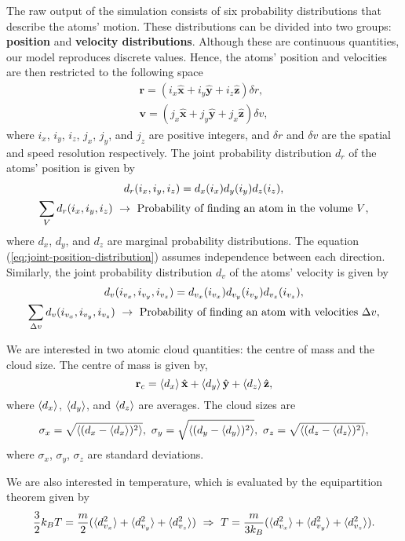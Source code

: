 The raw output of the simulation consists of six probability distributions that describe the atoms' motion. These distributions can be divided into two groups: \textbf{position} and \textbf{velocity distributions}. Although these are continuous quantities, our model reproduces discrete values. Hence, the atoms' position and velocities are then restricted to the following space
\begin{gather}
    \mathbf{r} = (i_x \hat{\mathbf{x}} + i_y \hat{\mathbf{y}} + i_z \hat{\mathbf{z}}) \delta r, \\
    \mathbf{v} = (j_x \hat{\mathbf{x}} + j_y \hat{\mathbf{y}} + j_x \hat{\mathbf{z}}) \delta v,
\end{gather}
where $ i_x $, $ i_y $, $ i_z $, $ j_x $, $ j_y $, and $ j_z $ are positive integers, and $ \delta r $ and $ \delta v $ are the spatial and speed resolution respectively. The joint probability distribution $d_r$ of the atoms' position is given by
\begin{gather}
    d_{r}(i_x, i_y, i_z) = d_x(i_x) d_y(i_y) d_z(i_z),
    \label{eq:joint-position-distribution}
    \\
    \sum_{V} d_r(i_x,i_y,i_z) \ \rightarrow\ \textrm{Probability of finding an atom in the volume $ V $},
\end{gather}
where $ d_{x} $, $ d_y $, and $ d_z $ are marginal probability distributions. The equation (\ref{eq:joint-position-distribution}) assumes independence between each direction. Similarly, the joint probability distribution $d_v$ of the atoms' velocity is given by
\begin{gather}
    d_{v}(i_{v_x}, i_{v_y}, i_{v_z}) = d_{v_x}(i_{v_x}) d_{v_y}(i_{v_y}) d_{v_z}(i_{v_z}),
    \label{eq:joint-position-distribution}
    \\
    \sum_{\Delta v} d_{v}(i_{v_x}, i_{v_y}, i_{v_z}) \ \rightarrow\ \textrm{Probability of finding an atom with velocities $ \Delta v $},
\end{gather}

We are interested in two atomic cloud quantities: the centre of mass and the cloud size. The centre of mass is given by,
\begin{equation}
    \mathbf{r}_c = \braket{d_x} \hat{\mathbf{x}} + \braket{d_y} \hat{\mathbf{y}} + \braket{d_z} \hat{\mathbf{z}},
\end{equation}
where $ \braket{d_x} $, $ \braket{d_y} $, and $ \braket{d_z} $ are averages. The cloud sizes are
\begin{equation}
    \sigma_x = \sqrt{\braket{(d_x - \braket{d_x})^2}},\ \sigma_y = \sqrt{\braket{(d_y - \braket{d_y})^2}},\ \sigma_z = \sqrt{\braket{(d_z - \braket{d_z})^2}},
\end{equation}
where $ \sigma_x $, $ \sigma_y $, $ \sigma_z $ are standard deviations.

We are also interested in temperature, which is evaluated by the equipartition theorem given by
\begin{equation}
    \frac{3}{2}k_B T = \frac{m}{2} (\braket{d_{v_x}^2} + \braket{d_{v_y}^2} + \braket{d_{v_z}^2})\ \Rightarrow\ T = \frac{m}{3k_B} (\braket{d_{v_x}^2} + \braket{d_{v_y}^2} + \braket{d_{v_z}^2}).
\end{equation}
